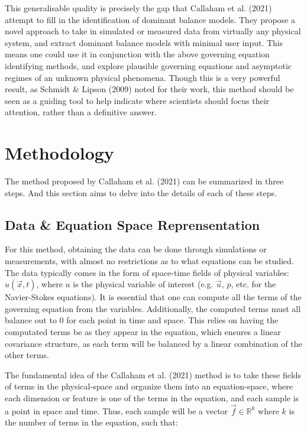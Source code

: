 \documentclass[12pt]{report} %
\begin{document}
\vspace{5mm}

This generalisable quality is precisely the gap that Callaham et al. (2021)\cite{callaham2021learning} attempt to fill in the identification of dominant balance models. They propose a novel approach to take in simulated or measured data from virtually any physical system, and extract dominant balance models with minimal user input. This means one could use it in conjunction with the above governing equation identifying methods, and explore plausible governing equations and asymptotic regimes of an unknown physical phenomena. Though this is a very powerful result, as Schmidt \& Lipson (2009)\cite{schmidt2009distilling} noted for their work, this method should be seen as a guiding tool to help indicate where scientists should focus their attention, rather than a definitive answer.


\chapter{Methodology}

The method proposed by Callaham et al. (2021)\cite{callaham2021learning} can be summarized in three steps. And this section aims to delve into the details of each of these steps.

\section{Data \& Equation Space Reprensentation}

For this method, obtaining the data can be done through simulations or measurements, with almost no restrictions as to what equations can be studied. The data typically comes in the form of space-time fields of physical variables: $u(\vec{x}, t)$, where $u$ is the physical variable of interest (e.g. $\vec{u}$, $p$, etc. for the Navier-Stokes equations). It is essential that one can compute all the terms of the governing equation from the variables. Additionally, the computed terms must all balance out to 0 for each point in time and space. This relies on having the computated terms be as they appear in the equation, which ensures a linear covariance structure, as each term will be balanced by a linear combination of the other terms\cite[Supplementary Information]{callaham2021learning}.

\vspace{5mm}

The fundamental idea of the Callaham et al. (2021) method is to take these fields of terms in the physical-space and organize them into an equation-space, where each dimension or feature is one of the terms in the equation, and each sample is a point in space and time. Thus, each sample will be a vector $\vec{f} \in \mathbb{R}^k$ where $k$ is the number of terms in the equation, such that:
\end{document}
